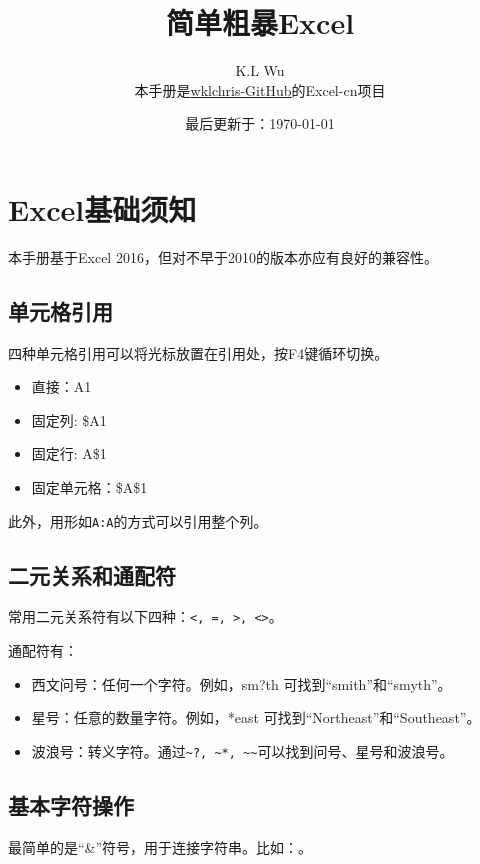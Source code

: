 
\title{简单粗暴Excel}
\author{K.L Wu\\
  {\kaishu 本手册是\href{https://github.com/wklchris/Note-by-LaTeX}{wklchris-GitHub}的Excel-cn项目}
}
\date{最后更新于：\today}


\maketitle

\setlength{\lineskiplimit}{0pt}
\tableofcontents
\setlength{\lineskiplimit}{3pt}

\chapter{Excel基础须知}
本手册基于Excel 2016，但对不早于2010的版本亦应有良好的兼容性。

\section{单元格引用}
四种单元格引用可以将光标放置在引用处，按F4键循环切换。
\begin{itemize}
\item 直接：A1
\item 固定列: \$A1
\item 固定行: A\$1
\item 固定单元格：\$A\$1
\end{itemize}

\vspace*{1ex}此外，用形如\texttt{A:A}的方式可以引用整个列。

\section{二元关系和通配符}
常用二元关系符有以下四种：\verb|<, =, >, <>|。\dpar

通配符有：
\begin{itemize}
\item 西文问号：任何一个字符。例如，sm?th 可找到``smith''和``smyth''。
\item 星号：任意的数量字符。例如，*east 可找到``Northeast''和``Southeast''。
\item 波浪号：转义字符。通过\verb|~?, ~*, ~~|可以找到问号、星号和波浪号。
\end{itemize}

\section{基本字符操作}
最简单的是“\&”符号，用于连接字符串。比如：。


